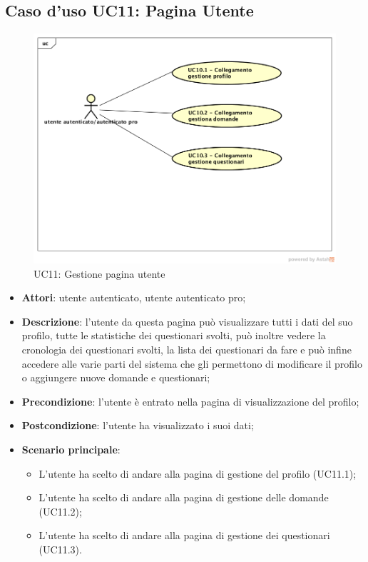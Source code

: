 \newpage
\subsection{Caso d'uso UC11: Pagina Utente}
\label{UC11}
\begin{figure}[h]
	\centering
	\includegraphics[scale=0.5]{UML/UC11.png}
	\caption{UC11: Gestione pagina utente}
\end{figure}

\begin{itemize}
\item\textbf{Attori}: utente autenticato, utente autenticato pro;
\item\textbf{Descrizione}: l'utente da questa pagina può visualizzare tutti i dati del suo profilo, tutte le statistiche dei questionari svolti, può inoltre vedere la cronologia dei questionari svolti, la lista dei questionari da fare e può infine accedere alle varie parti del sistema che gli permettono di modificare il profilo o aggiungere nuove domande e questionari;
\item\textbf{Precondizione}: l'utente è entrato nella pagina di visualizzazione del profilo;
\item\textbf{Postcondizione}: l'utente ha visualizzato i suoi dati;
\item\textbf{Scenario principale}:
\begin{itemize}
\item L'utente ha scelto di andare alla pagina di gestione del profilo (UC11.1);
\item L'utente ha scelto di andare alla pagina di gestione delle domande (UC11.2);  
\item L'utente ha scelto di andare alla pagina di gestione dei questionari (UC11.3).
\end{itemize}
\end{itemize}

